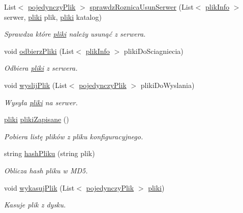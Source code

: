 \begin{CompactItemize}
List$<$ \hyperlink{a00020}{pojedynczyPlik} $>$ \hyperlink{a00037_e15914ff83794a5f6fb1e848c7640900}{sprawdzRoznicaUsunSerwer} (List$<$ \hyperlink{a00018}{plikInfo} $>$ serwer, \hyperlink{a00017}{pliki} plik, \hyperlink{a00017}{pliki} katalog)
\begin{CompactList}\small\item\em Sprawdza które \hyperlink{a00017}{pliki} należy usunąć z serwera. \item\end{CompactList}\item 
void \hyperlink{a00037_c6dbb2e2034a04a7abf666b24b419b6b}{odbierzPliki} (List$<$ \hyperlink{a00018}{plikInfo} $>$ plikiDoSciagniecia)
\begin{CompactList}\small\item\em Odbiera \hyperlink{a00017}{pliki} z serwera. \item\end{CompactList}\item 
void \hyperlink{a00037_ecff337c51d7c6aec79286ad97745b47}{wyslijPlik} (List$<$ \hyperlink{a00020}{pojedynczyPlik} $>$ plikiDoWyslania)
\begin{CompactList}\small\item\em Wysyła \hyperlink{a00017}{pliki} na serwer. \item\end{CompactList}\item 
\hyperlink{a00017}{pliki} \hyperlink{a00037_2806aca42bed01f5fefc1bda76b1f250}{plikiZapisane} ()
\begin{CompactList}\small\item\em Pobiera listę plików z pliku konfiguracyjnego. \item\end{CompactList}\item 
string \hyperlink{a00037_565af80b3fd64edae29abc5210555614}{hashPliku} (string plik)
\begin{CompactList}\small\item\em Oblicza hash pliku w MD5. \item\end{CompactList}\item 
void \hyperlink{a00037_4b2c5e502366b63f4115cecdb5873ccb}{wykasujPlik} (List$<$ \hyperlink{a00020}{pojedynczyPlik} $>$ \hyperlink{a00017}{pliki})
\begin{CompactList}\small\item\em Kasuje plik z dysku. \item\end{CompactList}\item 

\end{CompactItemize}

